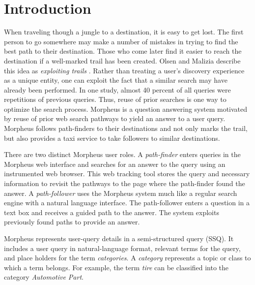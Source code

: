 \section{Introduction}



When traveling though a jungle to a destination, it is easy to get
lost.  The first person to go somewhere may make a number of mistakes
in trying to find the best path to their destination. Those
who come later find it easier to reach the destination if a
well-marked trail has been created. Olsen and Malizia describe this
idea as \emph{exploiting trails} \cite{5379671}.  Rather than treating
a user's discovery experience as a unique entity, one can exploit the fact that a similar search may have already been
performed.  In one study, almost 40 percent of all queries
were repetitions of previous queries\cite{1277770}. Thus, reuse of prior searches is one way to optimize the search
process.  Morpheus is a question answering system motivated by reuse of prior
web search pathways to yield an answer to a user query. Morpheus follows path-finders to their destinations and not only marks the
trail, but also provides a taxi service to take followers to similar
destinations.

There are two distinct Morpheus user roles. A
\textit{path-finder} enters queries in the Morpheus web interface and
searches for an answer to the query using an instrumented web browser. 
This web tracking tool stores the query
and necessary information to revisit the pathways to the page where the path-finder 
found the answer. A \textit{path-follower} uses the Morpheus system much like a regular search engine with a natural language interface. The path-follower enters a question in a text box and receives a guided path to the answer. The system exploits previously found paths to provide an answer.

Morpheus represents user-query details in a semi-structured query (SSQ). It includes a user query in natural-language format, relevant terms for the query, and place holders for the term \textit{categories}. A \textit{category} represents a
topic or class to which a term belongs. For example, the term \textit{tire} can be classified into the category \textit{Automotive Part}.

